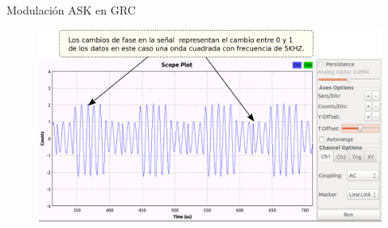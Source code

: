\begin{frame}{Modulación ASK en GRC}
\begin{figure}[H]
\centering
\includegraphics[width=\textwidth]{lab4/pdf/lab4_6.pdf}
\end{figure}
\end{frame}
